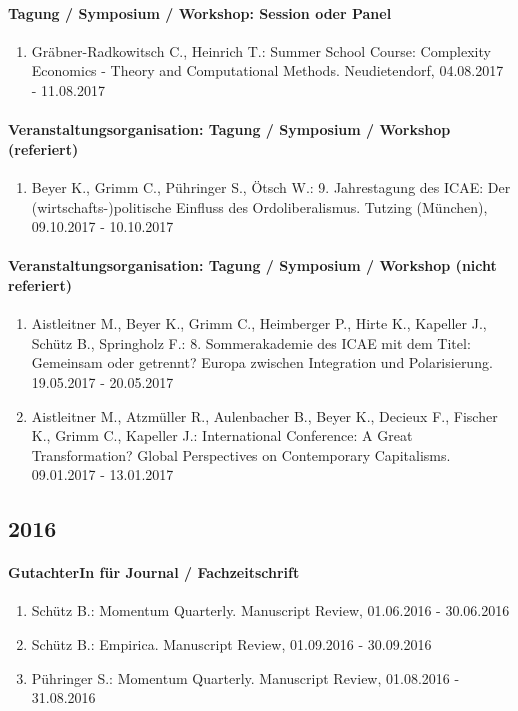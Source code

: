 \paragraph{Tagung / Symposium / Workshop: Session oder Panel}
\begin{enumerate}[leftmargin=*, labelsep=0.5cm]
\item Gräbner-Radkowitsch C., Heinrich T.: Summer School Course: Complexity Economics - Theory and Computational Methods. Neudietendorf, 04.08.2017 - 11.08.2017
\end{enumerate}
\paragraph{Veranstaltungsorganisation: Tagung / Symposium / Workshop (referiert)}
\begin{enumerate}[leftmargin=*, labelsep=0.5cm]
\item Beyer K., Grimm C., Pühringer S., Ötsch W.: 9. Jahrestagung des ICAE: Der (wirtschafts-)politische Einfluss des Ordoliberalismus. Tutzing (München), 09.10.2017 - 10.10.2017
\end{enumerate}
\paragraph{Veranstaltungsorganisation: Tagung / Symposium / Workshop (nicht referiert)}
\begin{enumerate}[leftmargin=*, labelsep=0.5cm]
\item Aistleitner M., Beyer K., Grimm C., Heimberger P., Hirte K., Kapeller J., Schütz B., Springholz F.: 8. Sommerakademie des ICAE mit dem Titel: Gemeinsam oder getrennt? Europa zwischen Integration und Polarisierung. 19.05.2017 - 20.05.2017
\item Aistleitner M., Atzmüller R., Aulenbacher B., Beyer K., Decieux F., Fischer K., Grimm C., Kapeller J.: International Conference: A Great Transformation? Global Perspectives on Contemporary Capitalisms. 09.01.2017 - 13.01.2017
\end{enumerate}\subsection*{2016}\paragraph{GutachterIn für Journal / Fachzeitschrift}
\begin{enumerate}[leftmargin=*, labelsep=0.5cm]
\item Schütz B.: Momentum Quarterly. Manuscript Review, 01.06.2016 - 30.06.2016
\item Schütz B.: Empirica. Manuscript Review, 01.09.2016 - 30.09.2016
\item Pühringer S.: Momentum Quarterly. Manuscript Review, 01.08.2016 - 31.08.2016
\end{enumerate}
